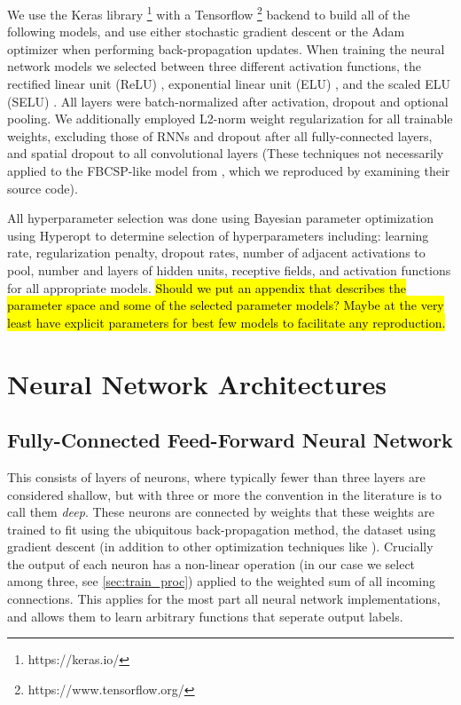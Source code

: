 \documentclass[utf8]{frontiersSCNS} %
\begin{document}
We use the Keras library \footnote{https://keras.io/} with a Tensorflow \footnote{https://www.tensorflow.org/} backend to build all of the following models, and use either stochastic gradient descent or the Adam optimizer  when performing back-propagation updates. When training the neural network models we selected between three different activation functions, the rectified linear unit (ReLU) \cite{He2015a}, exponential linear unit (ELU) \cite{Clevert}, and the scaled ELU (SELU) \cite{NIPS2017_6698}. All layers were batch-normalized \cite{Szegedy2015} after activation, dropout and optional pooling. We additionally employed L2-norm weight regularization for all trainable weights, excluding those of RNNs and dropout \cite{} after all fully-connected layers, and spatial dropout \cite{} to all convolutional layers (These techniques not necessarily applied to the FBCSP-like model from \cite{Schirrmeister2017}, which we reproduced by examining their source code).

All hyperparameter selection was done using Bayesian parameter optimization using Hyperopt \cite{Bergstra2013} to determine selection of hyperparameters including: learning rate, regularization penalty, dropout rates, number of adjacent activations to pool, number and layers of hidden units, receptive fields, and activation functions for all appropriate models. \hl{Should we put an appendix that describes the parameter space and some of the selected parameter models? Maybe at the very least have explicit parameters for best few models to facilitate any reproduction.}

\section{Neural Network Architectures}

\subsection{Fully-Connected Feed-Forward Neural Network}

This consists of layers of neurons, where typically fewer than three layers are considered shallow, but with three or more the convention in the literature is to call them \textit{deep}. These neurons are connected by weights that  these weights are trained to fit using the ubiquitous back-propagation method, \cite{Lecunn_phd, GoodfellowTextbook} the dataset using gradient descent (in addition to other optimization techniques like \cite{adam, rmsprop, etc}). Crucially the output of each neuron has a non-linear operation (in our case we select among three, see \ref{sec:train_proc}) applied to the weighted sum of all incoming connections. This applies for the most part all neural network implementations, and allows them to learn arbitrary functions that seperate output labels.
\end{document}
